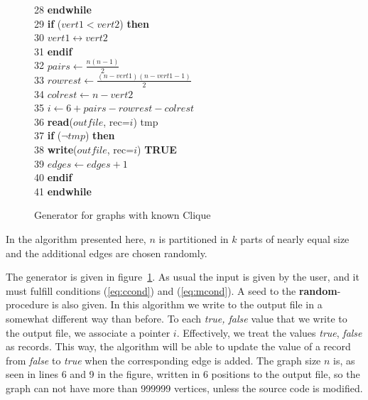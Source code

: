 \begin{figure}
{\begin{tabbing}
28 \> \> \> {\bf endwhile} \\
29 \> \> \> {\bf if} ($vert1 < vert2$) {\bf then} \\
30 \> \> \> \> $vert1 \leftrightarrow vert2$ \\
31 \> \> \> {\bf endif} \\
32 \> \> \> $pairs \leftarrow \frac{n(n-1)}{2}$ \\
33 \> \> \> $rowrest \leftarrow \frac{(n-vert1)(n-vert1-1)}{2}$\\
34 \> \> \> $colrest \leftarrow n-vert2$ \\
35 \> \> \> $i \leftarrow 6+pairs-rowrest-colrest$ \\
36 \> \> \> {\bf read}($outfile$, rec=$i$) tmp \\
37 \> \> \> {\bf if} ($\neg tmp$) {\bf then} \\
38 \> \> \> \> {\bf write}($outfile$, rec=$i$) {\bf TRUE} \\
39 \> \> \> \> $edges \leftarrow edges+1$ \\
40 \> \> \> {\bf endif} \\
41 \> \> {\bf endwhile} \\
\end{tabbing}
}
\caption{Generator for graphs with known Clique}
\label{alg:sanc}
\end{figure}
In the algorithm presented here, $n$ is partitioned in $k$
parts of nearly equal size and the additional edges are chosen randomly.

The generator is given in figure~\ref{alg:sanc}. As usual the input is
given by the user, and it must fulfill conditions (\ref{eq:ccond}) and
(\ref{eq:mcond}). A seed to the {\bf random}-procedure is also given.
In this algorithm we write to the output file in a somewhat different
way than before. To each {\em true, false} value that we write to the output
file, we associate a pointer $i$. Effectively, we treat the values {\em true\/},
{\em false\/} as records. This way, the algorithm will be able to update the
value of a record from {\em false\/} to {\em true} when the corresponding  edge
is added. The graph size $n$ is, as seen in lines 6 and 9 in the figure, written
in 6 positions to the output file, so the graph can not have more than 999999
vertices, unless the source code is modified.

